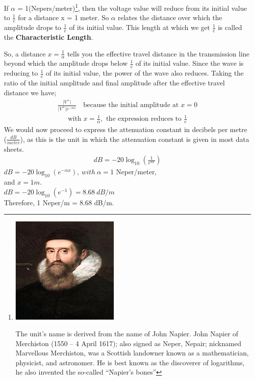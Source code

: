 If $\alpha$ = 1(Nepers/meter)\footnote{
\includegraphics[scale=0.2]{./graphics/johnnapier2}

The unit's name is derived from the name of John Napier. John Napier of Merchiston (1550 – 4 April 1617); also signed as Neper, Nepair; nicknamed Marvellous Merchiston, was a Scottish landowner known as a mathematician, physicist, and astronomer. He is best known as the discoverer of logarithms, he also invented the so-called \textquotedblleft Napier's bones\textquotedblright}, then the voltage value will reduce from its initial value to $\frac{1}{e}$ for a distance x = 1 meter. So $\alpha$ relates the distance over which the amplitude drops to $\frac{1}{e}$ of its initial value. This length at which we get $\frac{1}{e}$ is called the \textbf{Characteristic Length}. 

So, a distance $x = \frac{1}{\alpha}$ tells you the effective travel distance in the transmission line beyond which the amplitude drops below $\frac{1}{e}$ of its initial value. Since the wave is reducing to $\frac{1}{e}$ of its initial value, the power of the wave also reduces. Taking the ratio of the initial amplitude and final amplitude after the effective travel distance we have;
\begin{align*}
 \frac{\lvert V^+\rvert}{\lvert V^+\rvert e ^{-\alpha x}} \quad \text{because the initial amplitude at } x = 0
\end{align*}
\begin{align*}
\text{with }x = \frac{1}{\alpha},\text{ the expression reduces to }\frac{1}{e}
\end{align*}
We would now proceed to express the attenuation constant in decibels per metre ($\frac{dB}{meter}$), as this is the unit in which the attenuation constant is given in most data sheets.
\begin{align*}
dB = -20\log_{10}(\frac{1}{e^{\alpha x}})
\end{align*}
$ dB = -20\log_{10}(e^{-\alpha x}), \ with \ \alpha = 1 $ Neper/meter,\\ and $ x = 1m $. \\
$ dB = -20\log_{10}(e^{-1}) = 8.68\ dB/m  $\\
Therefore, 1 Neper/m = 8.68 dB/m.\\

